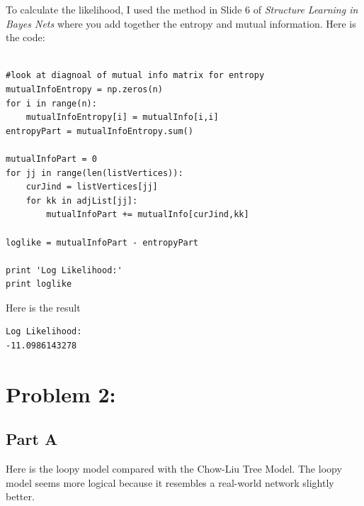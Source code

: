 \documentclass[twoside,11pt]{article}
\theoremstyle{definition}
\begin{document}
To calculate the likelihood, I used the method in Slide 6 of \textit{Structure Learning in Bayes Nets} where you add together the entropy and mutual information. Here is the code:
\begin{lstlisting}

#look at diagnoal of mutual info matrix for entropy
mutualInfoEntropy = np.zeros(n)
for i in range(n):
    mutualInfoEntropy[i] = mutualInfo[i,i]
entropyPart = mutualInfoEntropy.sum()

mutualInfoPart = 0
for jj in range(len(listVertices)):
    curJind = listVertices[jj]
    for kk in adjList[jj]:
        mutualInfoPart += mutualInfo[curJind,kk]

loglike = mutualInfoPart - entropyPart

print 'Log Likelihood:'
print loglike
\end{lstlisting}

Here is the result
\begin{lstlisting}
Log Likelihood:
-11.0986143278
\end{lstlisting}

\newpage

\section*{Problem 2:}

\subsection*{Part A}

Here is the loopy model compared with the Chow-Liu Tree Model. The loopy model seems more logical because it resembles a real-world network slightly better. 
\end{document}
